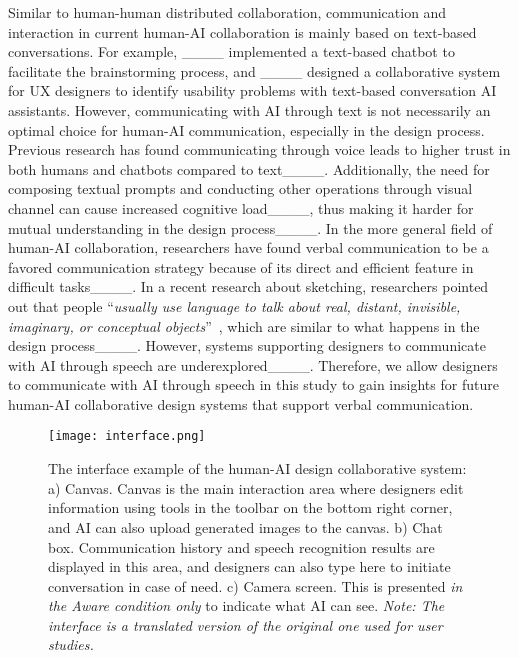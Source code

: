 Similar to human-human distributed collaboration, communication and interaction in current human-AI collaboration is mainly based on text-based conversations. For example, ____ implemented a text-based chatbot to facilitate the brainstorming process, and ____ designed a collaborative system for UX designers to identify usability problems with text-based conversation AI assistants. However, communicating with AI through text is not necessarily an optimal choice for human-AI communication, especially in the design process. Previous research has found communicating through voice leads to higher trust in both humans and chatbots compared to text____. Additionally, the need for composing textual prompts and conducting other operations through visual channel can cause increased cognitive load____, thus making it harder for mutual understanding in the design process____. In the more general field of human-AI collaboration, researchers have found verbal communication to be a favored communication strategy because of its direct and efficient feature in difficult tasks____. In a recent research about sketching, researchers pointed out that people ``\textit{usually use language to talk about real, distant, invisible, imaginary, or conceptual objects}''~\cite[p.~4-5]{Rosenberg2024DrawTalking}, which are similar to what happens in the design process____. However, systems supporting designers to communicate with AI through speech are underexplored____. Therefore, we allow designers to communicate with AI through speech in this study to gain insights for future human-AI collaborative design systems that support verbal communication.

\begin{figure*}[!th]
    \centering
    \texttt{[image: interface.png]}
    \caption{The interface example of the human-AI design collaborative system: a) Canvas. Canvas is the main interaction area where designers edit information using tools in the toolbar on the bottom right corner, and AI can also upload generated images to the canvas. b) Chat box. Communication history and speech recognition results are displayed in this area, and designers can also type here to initiate conversation in case of need. c) Camera screen. This is presented \textit{in the Aware condition only} to indicate what AI can see. \textit{Note: The interface is a translated version of the original one used for user studies.}}
    \label{fig:interface}
\end{figure*}


